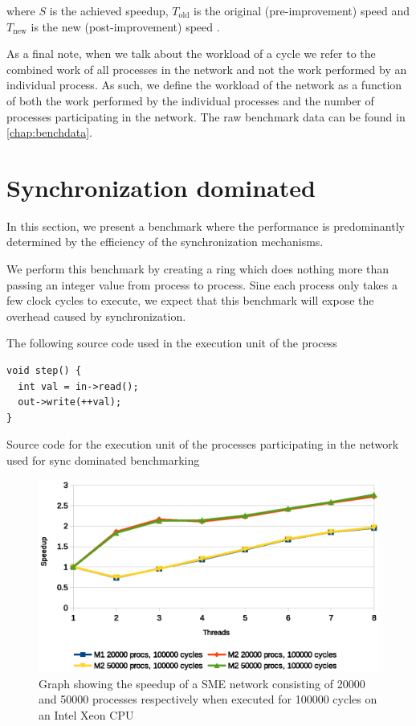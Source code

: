 where $S$ is the achieved speedup, $T_{\text{old}}$ is the original
(pre-improvement) speed and $T_{\text{new}}$ is the new
(post-improvement) speed \cite{hennessy2012computer}.

As a final note, when we talk about the workload of a cycle we refer
to the combined work of all processes in the network and not the work
performed by an individual process. As such, we define the workload of
the network as a function of both the work performed by the individual
processes and the number of processes participating in the
network. The raw benchmark data can be found in \cref{chap:benchdata}.

\section{Synchronization dominated}
In this section, we present a benchmark where the performance is
predominantly determined by the efficiency of the synchronization
mechanisms.

We perform this benchmark by creating a ring which does nothing more
than passing an integer value from process to process. Sine each
process only takes a few clock cycles to execute, we expect that this
benchmark will expose the overhead caused by synchronization.

The following source code used in the execution unit of the process
\begin{listing}
\begin{verbatim}
void step() {
  int val = in->read();
  out->write(++val);
}
\end{verbatim}

\caption{Source code for the execution unit of the processes
  participating in the network used for sync dominated benchmarking}
\end{listing}

\begin{figure}
\centering
\includegraphics[width=\textwidth]{graphs/intel-sync}
\caption[Benchmark graph]{Graph showing the speedup of a SME network
  consisting of 20000 and 50000 processes respectively when executed
  for 100000 cycles on an Intel Xeon CPU}
\label{fig:intel-sync}
\end{figure}

